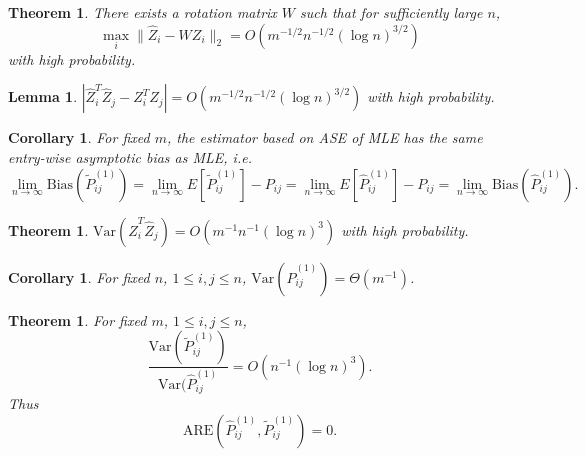 \documentclass[a4paper]{article}
\newtheorem{lemma}[fact]{Lemma}
\newtheorem{theorem}[fact]{Theorem}
\newtheorem{corollary}[fact]{Corollary}
\begin{document}
\begin{theorem}
\label{thm:XhatDiffXWL1}
There exists a rotation matrix $W$ such that for sufficiently large $n$,
\[
	\max_i \| \hat{Z}_i - W Z_i \|_2 = O(m^{-1/2} n^{-1/2} (\log n)^{3/2})
\]
with high probability.
\end{theorem}





\begin{lemma}
\label{lemma:1stMomentPhatDiffL1}
$\left|  \hat{Z}_i^T \hat{Z}_j - Z_i^T Z_j \right| = O(m^{-1/2} n^{-1/2} (\log n)^{3/2})$ with high probability.
\end{lemma}





\begin{corollary}
\label{cor:L1Consistent}
For fixed $m$, the estimator based on ASE of MLE has the same entry-wise asymptotic bias as MLE, i.e.
\[
	\lim_{n \to \infty} \mathrm{Bias}(\widetilde{P}_{ij}^{(1)}) = \lim_{n \to \infty} E[\widetilde{P}_{ij}^{(1)}] - P_{ij} = \lim_{n \to \infty} E[\hat{P}^{(1)}_{ij}] - P_{ij}
    = \lim_{n \to \infty} \mathrm{Bias}(\hat{P}_{ij}^{(1)}).
\]
\end{corollary}




\begin{theorem}
\label{thm:VarASEL1}
$\mathrm{Var}(\hat{Z}_i^T \hat{Z}_j) = O(m^{-1} n^{-1} (\log n)^3)$ with high probability.
\end{theorem}




\begin{corollary}
\label{cor:VarL1}
For fixed $n$, $1 \le i,j \le n$, $\mathrm{Var}(\hat{P}^{(1)}_{ij}) = \Theta(m^{-1})$.
\end{corollary}





\begin{theorem}
\label{thm:AREL1}
For fixed $m$, $1 \le i, j \le n$,
\[
	\frac{\mathrm{Var}(\widetilde{P}_{ij}^{(1)})}{\mathrm{Var}(\hat{P}_{ij}^{(1)}}
    = O(n^{-1} (\log n)^3).
\]
Thus
\[
	\mathrm{ARE}(\hat{P}_{ij}^{(1)}, \widetilde{P}_{ij}^{(1)}) = 0.
\]
\end{theorem}
\end{document}
